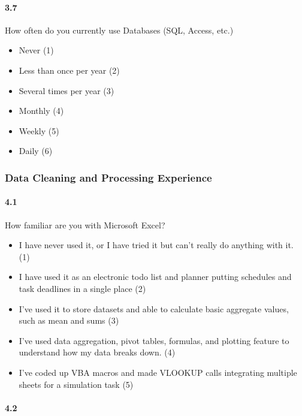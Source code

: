 \documentclass[020-persona\_validation.tex]{subfiles}
\begin{document}
        \paragraph{3.7}

            How often do you currently use Databases (SQL, Access, etc.)

            \begin{itemize}
                \item Never  (1)
                \item Less than once per year  (2)
                \item Several times per year  (3)
                \item Monthly  (4)
                \item Weekly  (5)
                \item Daily  (6)
            \end{itemize}

    \subsubsection{Data Cleaning and Processing Experience}

        \paragraph{4.1}

            How familiar are you with Microsoft Excel?

            \begin{itemize}
                \item I have never used it, or I have tried it but can't really do anything with it.  (1)
                \item I have used it as an electronic todo list and planner putting schedules and task deadlines in a single place  (2)
                \item I've used it to store datasets and able to calculate basic aggregate values, such as mean and sums  (3)
                \item I've used data aggregation, pivot tables, formulas, and plotting feature to understand how my data breaks down.  (4)
                \item I’ve coded up VBA macros and made VLOOKUP calls integrating multiple sheets for a simulation task  (5)
            \end{itemize}

        \paragraph{4.2}
\end{document}
